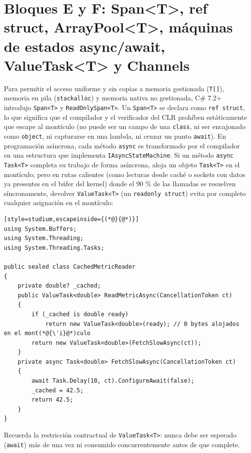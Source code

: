 \documentclass{book}
\begin{document}
\section{Bloques E y F: Span<T>, ref struct, ArrayPool<T>, máquinas de estados async/await, ValueTask<T> y Channels}

Para permitir el acceso uniforme y sin copias a memoria gestionada (\texttt{T[]}), memoria en pila (\texttt{stackalloc}) y memoria nativa no gestionada, C\# 7.2+ introdujo \texttt{Span<T>} y \texttt{ReadOnlySpan<T>}. Un \texttt{Span<T>} se declara como \texttt{ref struct}, lo que significa que el compilador y el verificador del CLR prohíben estáticamente que escape al montículo (no puede ser un campo de una \texttt{class}, ni ser encajonado como \texttt{object}, ni capturarse en una lambda, ni cruzar un punto \texttt{await}). En programación asíncrona, cada método \texttt{async} es transformado por el compilador en una estructura que implementa \texttt{IAsyncStateMachine}. Si un método \texttt{async Task<T>} completa su trabajo de forma asíncrona, aloja un objeto \texttt{Task<T>} en el montículo; pero en rutas calientes (como lecturas desde caché o sockets con datos ya presentes en el búfer del kernel) donde el 90 \% de las llamadas se resuelven síncronamente, devolver \texttt{ValueTask<T>} (un \texttt{readonly struct}) evita por completo cualquier asignación en el montículo:
\begin{lstlisting}[style=studium,escapeinside={(*@}{@*)}]
using System.Buffers;
using System.Threading;
using System.Threading.Tasks;

public sealed class CachedMetricReader
{
    private double? _cached;
    public ValueTask<double> ReadMetricAsync(CancellationToken ct)
    {
        if (_cached is double ready)
            return new ValueTask<double>(ready); // 0 bytes alojados en el mont(*@{\'i}@*)culo
        return new ValueTask<double>(FetchSlowAsync(ct));
    }
    private async Task<double> FetchSlowAsync(CancellationToken ct)
    {
        await Task.Delay(10, ct).ConfigureAwait(false);
        _cached = 42.5;
        return 42.5;
    }
}
\end{lstlisting}
Recuerda la restricción contractual de \texttt{ValueTask<T>}: nunca debe ser esperado (\texttt{await}) más de una vez ni consumido concurrentemente antes de que complete.
\end{document}
